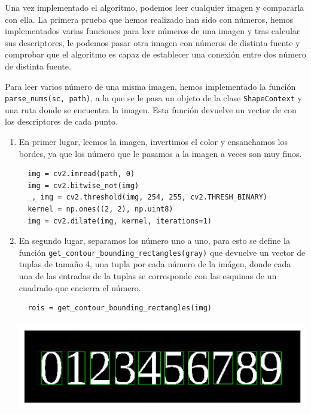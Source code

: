 \documentclass[size=a4, parskip=half, titlepage=false, toc=flat, toc=bib, 12pt]{scrartcl}
\begin{document}
Una vez implementado el algoritmo, podemos leer cualquier imagen y compararla con ella. La primera prueba que hemos realizado han sido con números, hemos implementados varias funciones para leer números de una imagen y tras calcular sus descriptores, le podemos pasar otra imagen con números de distinta fuente y comprobar que el algoritmo es capaz de establecer una conexión entre dos número de distinta fuente.

Para leer varios número de una misma imagen, hemos implementado la función \verb|parse_nums(sc, path)|, a la que se le pasa un objeto de la clase \verb|ShapeContext| y una ruta donde se encuentra la imagen. Esta función devuelve un vector de con los descriptores de cada punto.
\begin{enumerate}

\item En primer lugar, leemos la imagen, invertimos el color y ensanchamos los bordes, ya que los número que le pasamos a la imagen a veces son muy finos.

\begin{verbatim}
  img = cv2.imread(path, 0)
  img = cv2.bitwise_not(img)
  _, img = cv2.threshold(img, 254, 255, cv2.THRESH_BINARY)
  kernel = np.ones((2, 2), np.uint8)
  img = cv2.dilate(img, kernel, iterations=1)
\end{verbatim}

\item En segundo lugar, separamos los número uno a uno, para esto se define la función \verb|get_contour_bounding_rectangles(gray)| que devuelve un vector de tuplas de tamaño 4, una tupla por cada número de la imágen, donde cada una de las entradas de la tuplas se corresponde con las esquinas de un cuadrado que encierra el número.

\begin{verbatim}
  rois = get_contour_bounding_rectangles(img)
\end{verbatim}

\begin{center}
\includegraphics[height=4cm]{./img/numeros}
\end{center}


\end{enumerate}
\end{document}
